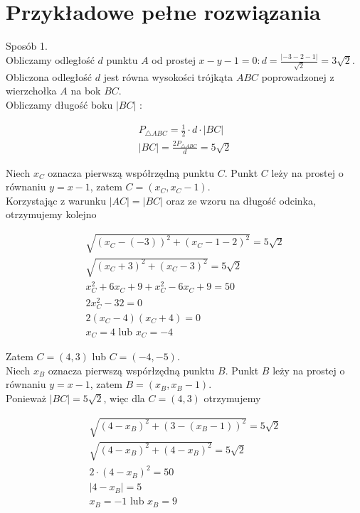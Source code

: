 \documentclass[10pt]{article}
\begin{document}
\section*{Przykładowe pełne rozwiązania}
Sposób 1.\\
Obliczamy odległość $d$ punktu $A$ od prostej $x-y-1=0: d=\frac{|-3-2-1|}{\sqrt{2}}=3 \sqrt{2}$.\\
Obliczona odległość $d$ jest równa wysokości trójkąta $A B C$ poprowadzonej z wierzchołka $A$ na bok $B C$.\\
Obliczamy długość boku $|B C|$ :

$$
\begin{gathered}
P_{\triangle A B C}=\frac{1}{2} \cdot d \cdot|B C| \\
|B C|=\frac{2 P_{\triangle A B C}}{d}=5 \sqrt{2}
\end{gathered}
$$

Niech $x_{C}$ oznacza pierwszą współrzędną punktu $C$. Punkt $C$ leży na prostej o równaniu $y=x-1$, zatem $C=\left(x_{C}, x_{C}-1\right)$.\\
Korzystając z warunku $|A C|=|B C|$ oraz ze wzoru na długość odcinka, otrzymujemy kolejno

$$
\begin{gathered}
\sqrt{\left(x_{C}-(-3)\right)^{2}+\left(x_{C}-1-2\right)^{2}}=5 \sqrt{2} \\
\sqrt{\left(x_{C}+3\right)^{2}+\left(x_{C}-3\right)^{2}}=5 \sqrt{2} \\
x_{C}^{2}+6 x_{C}+9+x_{C}^{2}-6 x_{C}+9=50 \\
2 x_{C}^{2}-32=0 \\
2\left(x_{C}-4\right)\left(x_{C}+4\right)=0 \\
x_{C}=4 \text { lub } x_{C}=-4
\end{gathered}
$$

Zatem $C=(4,3)$ lub $C=(-4,-5)$.\\
Niech $x_{B}$ oznacza pierwszą wspórłzędną punktu $B$. Punkt $B$ leży na prostej o równaniu $y=x-1$, zatem $B=\left(x_{B}, x_{B}-1\right)$.\\
Ponieważ $|B C|=5 \sqrt{2}$, więc dla $C=(4,3)$ otrzymujemy

$$
\begin{gathered}
\sqrt{\left(4-x_{B}\right)^{2}+\left(3-\left(x_{B}-1\right)\right)^{2}}=5 \sqrt{2} \\
\sqrt{\left(4-x_{B}\right)^{2}+\left(4-x_{B}\right)^{2}}=5 \sqrt{2} \\
2 \cdot\left(4-x_{B}\right)^{2}=50 \\
\left|4-x_{B}\right|=5 \\
x_{B}=-1 \text { lub } x_{B}=9
\end{gathered}
$$
\end{document}
